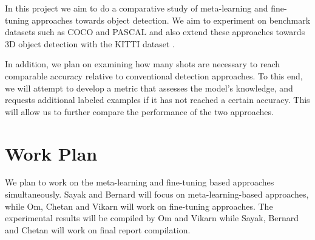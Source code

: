 \documentclass{article}
\begin{document}
{In this project we aim to do a comparative study of meta-learning and fine-tuning approaches 
towards object detection. We aim to experiment on benchmark datasets such as 
COCO \cite{LinMBHPRDZ14} and PASCAL \cite{Everingham10} and also extend these approaches 
towards 3D object detection with the KITTI dataset \cite{Geiger2013IJRR}.

In addition, we plan on examining how many shots are necessary to reach comparable accuracy relative to 
conventional detection approaches. To this end, we will attempt to develop a metric that assesses
the model's knowledge, and requests additional labeled examples if it has not reached a certain accuracy. 
This will allow us to further compare the performance of the two approaches. 

\section{Work Plan}

We plan to work on the meta-learning and fine-tuning based approaches simultaneously. 
Sayak and Bernard will focus on meta-learning-based approaches, while Om, Chetan and Vikarn will work 
on fine-tuning approaches. The experimental results will be compiled by Om and Vikarn while Sayak, 
Bernard and Chetan will work on final report compilation. 
}
\fi 

























\end{document}
